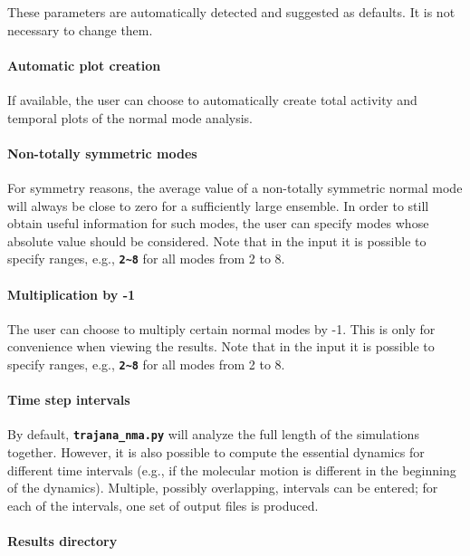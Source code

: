 \documentclass[a4paper,10pt,DIV=15,openany]{scrbook}
\newcommand{\ttt}[1]{\textbf{\texttt{#1}}}
\begin{document}
These parameters are automatically detected and suggested as defaults.
It is not necessary to change them.

\paragraph{Automatic plot creation}

If available, the user can choose to automatically create total activity and temporal plots of the normal mode analysis.

\paragraph{Non-totally symmetric modes}

For symmetry reasons, the average value of a non-totally symmetric normal mode will always be close to zero for a sufficiently large ensemble.
In order to still obtain useful information for such modes, the user can specify modes whose absolute value should be considered.
Note that in the input it is possible to specify ranges, e.g., \ttt{2\textasciitilde8} for all modes from 2 to 8.

\paragraph{Multiplication by -1}

The user can choose to multiply certain normal modes by -1.
This is only for convenience when viewing the results.
Note that in the input it is possible to specify ranges, e.g., \ttt{2\textasciitilde8} for all modes from 2 to 8.

\paragraph{Time step intervals}

By default, \ttt{trajana\_nma.py} will analyze the full length of the simulations together. 
However, it is also possible to compute the essential dynamics for different time intervals (e.g., if the molecular motion is different in the beginning of the dynamics).
Multiple, possibly overlapping, intervals can be entered; for each of the intervals, one set of output files is produced.

\paragraph{Results directory}
\end{document}

